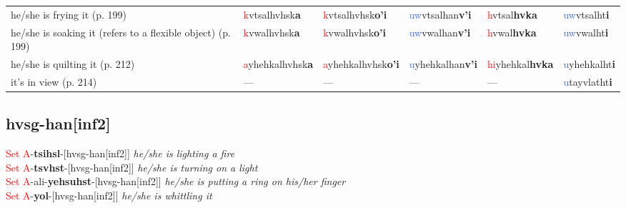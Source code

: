 \documentclass[oneside,openany]{book}%
\begin{document}
\begin{tabularx}{\textwidth}{>{\hsize=1.5\hsize\RaggedRight}X >{\hsize=0.9\hsize}X >{\hsize=0.9\hsize}X >{\hsize=0.9\hsize}X >{\hsize=0.9\hsize}X >{\hsize=0.9\hsize}X}
he/she is frying it (p. 199)&\textcolor{Red}{k}vtsalhvhsk\textbf{a}&\textcolor{Red}{k}vtsalhvhsk\textbf{o'i}&\textcolor{RoyalBlue}{uw}vtsalhan\textbf{v'i}&\textcolor{Red}{h}vtsal\textbf{hvka}&\textcolor{RoyalBlue}{uw}vtsalht\textbf{i}\\%
he/she is soaking it (refers to a flexible object) (p. 199)&\textcolor{Red}{k}vwalhvhsk\textbf{a}&\textcolor{Red}{k}vwalhvhsk\textbf{o'i}&\textcolor{RoyalBlue}{uw}vwalhan\textbf{v'i}&\textcolor{Red}{h}vwal\textbf{hvka}&\textcolor{RoyalBlue}{uw}vwalht\textbf{i}\\%
he/she is quilting it (p. 212)&\textcolor{Red}{a}yhehkalhvhsk\textbf{a}&\textcolor{Red}{a}yhehkalhvhsk\textbf{o'i}&\textcolor{RoyalBlue}{u}yhehkalhan\textbf{v'i}&\textcolor{Red}{hi}yhehkal\textbf{hvka}&\textcolor{RoyalBlue}{u}yhehkalht\textbf{i}\\%
it's in view (p. 214)&---&---&---&---&\textcolor{RoyalBlue}{u}tayvlatht\textbf{i}\\%
\bottomrule%
\end{tabularx}%
\vspace{1em}%
\needspace{1in}%
\subsection*{hvsg-han[inf2]}%
\textcolor{Red}{Set A}{-}\textbf{tsihsl}{-}[hvsg-han[inf2]] \textit{ he/she is lighting a fire} \\%
\textcolor{Red}{Set A}{-}\textbf{tsvhst}{-}[hvsg-han[inf2]] \textit{ he/she is turning on a light} \\%
\textcolor{Red}{Set A}{-}ali{-}\textbf{yehsuhst}{-}[hvsg-han[inf2]] \textit{ he/she is putting a ring on his/her finger} \\%
\textcolor{Red}{Set A}{-}\textbf{yol}{-}[hvsg-han[inf2]] \textit{ he/she is whittling it} \\%
\vspace{1em}%
\needspace{1in}%
\end{document}

